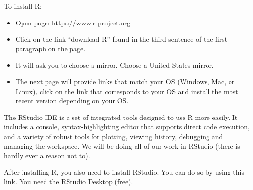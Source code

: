 \documentclass{./../Latex/handout}
\begin{document}
\thispagestyle{plain}

To install R:
\begin{itemize}
\item Open page: \href{https://www.r-project.org}{https://www.r-project.org}
\item 
Click on the link “download R” found in the third sentence of the first paragraph on the page.
\item It will ask you to choose a mirror. Choose a United States mirror.
\item The next page will provide links that match your OS (Windows, Mac, or Linux), click on the link that corresponds to your OS and install the most recent version depending on your OS. %
\end{itemize}

The RStudio IDE is a set of integrated tools designed to use R more easily. It includes a console,
syntax-highlighting editor that supports direct code execution, and a variety of robust tools for
plotting, viewing history, debugging and managing the workspace. We will be doing all of our work
in RStudio (there is hardly ever a reason not to).

After installing R, you also need to install RStudio. You can do so by using this \href{https://www.rstudio.com/products/rstudio/download/#download}{link}. You need the RStudio Desktop (free).
\end{document}
